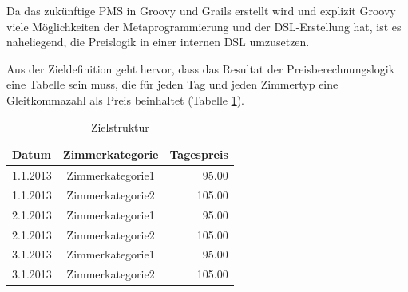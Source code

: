\documentclass[11pt,english,ngerman, headsepline]{scrreprt}
\begin{document}
Da das zukünftige PMS in Groovy und Grails erstellt wird und explizit Groovy viele
Möglichkeiten der Metaprogrammierung und der DSL-Erstellung hat, ist es
naheliegend, die Preislogik in einer internen DSL umzusetzen. 

Aus der Zieldefinition geht hervor, dass das Resultat der Preisberechnungslogik
eine Tabelle sein muss, die für jeden Tag und jeden Zimmertyp eine Gleitkommazahl als
Preis beinhaltet (Tabelle \ref{zielDefinition}).  

\begin{table}[htpb]
  \centering
  \begin{tabular}{| l | c | r |} 
 	\hline 
  	Datum & Zimmerkategorie & Tagespreis \\
  	\hline 
	1.1.2013 &  Zimmerkategorie1 &  95.00 \\
	1.1.2013 &  Zimmerkategorie2 &  105.00 \\
	2.1.2013 &  Zimmerkategorie1 &  95.00 \\
	2.1.2013 &  Zimmerkategorie2 &  105.00 \\
	3.1.2013 &  Zimmerkategorie1 &  95.00 \\
	3.1.2013 &  Zimmerkategorie2 &  105.00 \\
	\hline 
  	\end{tabular}  
 	\caption{Zielstruktur}
  \label{zielDefinition}
\end{table}	 
\end{document}
